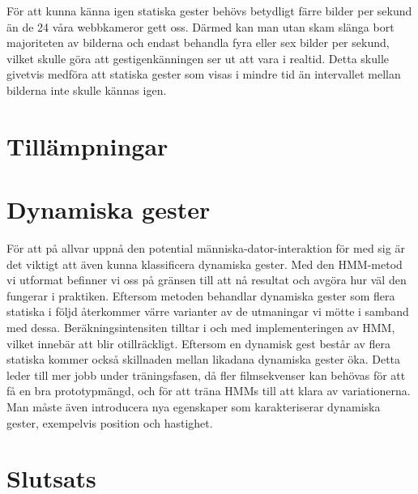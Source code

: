 \documentclass[../rapport_MVEX01-11-05]{subfiles}
\begin{document}
För att kunna känna igen statiska gester behövs betydligt färre bilder per
sekund än de 24 våra webbkameror gett oss. Därmed kan man utan skam slänga
bort majoriteten av bilderna och endast behandla fyra eller sex bilder per
sekund, vilket skulle göra att gestigenkänningen ser ut att vara i realtid.
Detta skulle givetvis medföra att statiska gester som visas i mindre tid
än intervallet mellan bilderna inte skulle kännas igen.


\section{Tillämpningar}

\section{Dynamiska gester}
För att på allvar uppnå den potential människa-dator-interaktion för med sig
är det viktigt att även kunna klassificera dynamiska gester. Med den HMM-metod 
vi utformat befinner vi oss på gränsen till att nå resultat och avgöra hur väl 
den fungerar i praktiken. Eftersom metoden behandlar dynamiska gester som flera 
statiska i följd återkommer värre varianter  
av de utmaningar vi mötte i samband med dessa. 
Beräkningsintensiten tilltar i och med implementeringen av HMM, vilket innebär 
att \MATLAB blir otillräckligt. Eftersom en dynamisk gest består av flera statiska
kommer också skillnaden mellan likadana dynamiska gester öka. Detta leder till 
mer jobb under träningsfasen, då fler filmsekvenser kan behövas för att få en 
bra prototypmängd, och för att träna HMMs till att klara av variationerna. 
Man måste även introducera nya egenskaper som karakteriserar dynamiska gester, 
exempelvis position och hastighet. 




\section{Slutsats}
\end{document}
